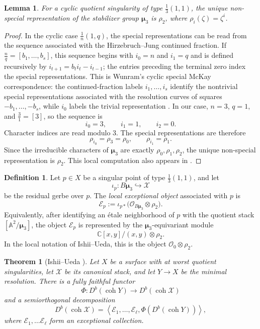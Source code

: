 \documentclass[11pt]{article}
\theoremstyle{plain}
\newtheorem{theorem}{Theorem}[section]
\newtheorem{lemma}[lemma]{Lemma}
\theoremstyle{definition}
\newtheorem{definition}[definition]{Definition}
\theoremstyle{remark}
\newcommand{\A}{\mathbb A}
\newcommand{\C}{\mathbb C}
\newcommand{\Db}{D^b}
\newcommand{\coh}{\operatorname{coh}}
\newcommand{\XX}{\mathcal X}
\newcommand{\muthree}{\boldsymbol{\mu}_3}
\newcommand{\OO}{\mathcal O}
\begin{document}
\begin{lemma}\label{lem:non-special-13}
For a cyclic quotient singularity of type \(\frac13(1,1)\), the unique non-special representation of the stabilizer group \(\muthree\) is \(\rho_2\), where \(\rho_i(\zeta)=\zeta^i\).
\end{lemma}

\begin{proof}
In the cyclic case \(\frac1n(1,q)\), the special representations can be read from the sequence associated with the Hirzebruch--Jung continued fraction. If \(\frac nq=[b_1,\dots,b_s]\), this sequence begins with \(i_0=n\) and \(i_1=q\) and is defined recursively by \(i_{t+1}=b_ti_t-i_{t-1}\); the entries preceding the terminal zero index the special representations. This is Wunram's cyclic special McKay correspondence: the continued-fraction labels \(i_1,\dots,i_s\) identify the nontrivial special representations associated with the resolution curves of squares \(-b_1,\dots,-b_s\), while \(i_0\) labels the trivial representation \cite[Theorems~2.3 and~3.2]{Ishii2015}. In our case, \(n=3\), \(q=1\), and \(\frac31=[3]\), so the sequence is
\[
i_0=3,\qquad i_1=1,\qquad i_2=0.
\]
Character indices are read modulo \(3\). The special representations are therefore
\[
\rho_{i_0}=\rho_3=\rho_0,
\qquad
\rho_{i_1}=\rho_1.
\]
Since the irreducible characters of \(\muthree\) are exactly \(\rho_0,\rho_1,\rho_2\), the unique non-special representation is \(\rho_2\). This local computation also appears in \cite[Example~2.6]{GugiattiRota2023}.
\end{proof}

\begin{definition}
Let \(p\in X\) be a singular point of type \(\frac13(1,1)\), and let
\[
\iota_p:B\muthree\hookrightarrow \XX
\]
be the residual gerbe over \(p\). The \emph{local exceptional object} associated with \(p\) is
\[
\mathcal E_p
:=
\iota_{p*}\bigl(\OO_{B\muthree}\otimes \rho_2\bigr).
\]
Equivalently, after identifying an étale neighborhood of \(p\) with the quotient stack \([\A^2/\muthree]\), the object \(\mathcal E_p\) is represented by the \(\muthree\)-equivariant module
\[
\C[x,y]/(x,y)\otimes \rho_2.
\]
In the local notation of Ishii--Ueda, this is the object \(\OO_0\otimes\rho_2\).
\end{definition}

\begin{theorem}[Ishii--Ueda {\cite[Theorem 1.4]{Ishii2015}}]\label{thm:ishii-ueda-global}
Let \(X\) be a surface with at worst quotient singularities, let \(\XX\) be its canonical stack, and let \(Y\to X\) be the minimal resolution. There is a fully faithful functor
\[
\Phi:\Db(\coh Y)\to \Db(\coh \XX)
\]
and a semiorthogonal decomposition
\[
\Db(\coh \XX)
=
\left\langle
\mathcal E_1,\dots,\mathcal E_\ell,\Phi(\Db(\coh Y))
\right\rangle,
\]
where \(\mathcal E_1,\dots\mathcal E_\ell\) form an exceptional collection. 
\end{theorem}
\end{document}
